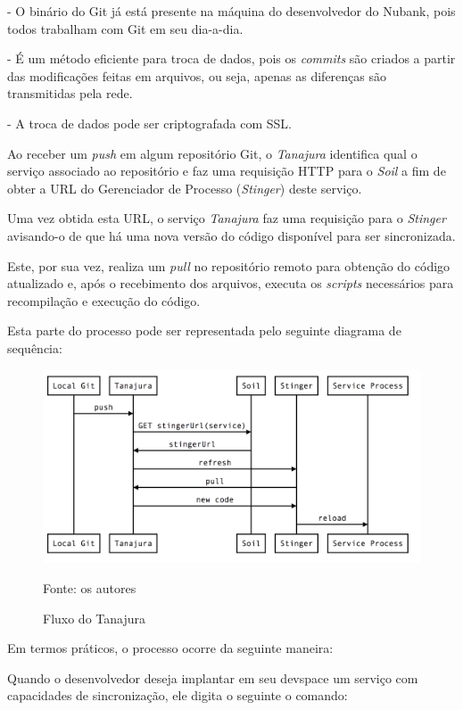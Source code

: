 \documentclass[]{politex}
\newcommand{\legend}[1]{\begin{center}\def\caption{}\caption{#1}\end{center}}
\begin{document}
	- O binário do Git já está presente na máquina do desenvolvedor do Nubank, pois todos trabalham com Git em seu dia-a-dia.
	
	- É um método eficiente para troca de dados, pois os \textit{commits} são criados a partir das modificações feitas em arquivos, ou seja, apenas as diferenças são transmitidas pela rede.
	
	- A troca de dados pode ser criptografada com SSL.

	Ao receber um \textit{push} em algum repositório Git, o \textit{Tanajura} identifica qual o serviço associado ao repositório e faz uma requisição HTTP para o \textit{Soil} a fim de obter a URL do Gerenciador de Processo (\textit{Stinger}) deste serviço.
	
	Uma vez obtida esta URL, o serviço \textit{Tanajura} faz uma requisição para o \textit{Stinger} avisando-o de que há uma nova versão do código disponível para ser sincronizada.
	
	Este, por sua vez, realiza um \textit{pull} no repositório remoto para obtenção do código atualizado e, após o recebimento dos arquivos, executa os \textit{scripts} necessários para recompilação e execução do código.
	
	Esta parte do processo pode ser representada pelo seguinte diagrama de sequência:
		\begin{figure}[htb]
			\caption{\label{fig_arquitetura2}Fluxo do Tanajura}
			\begin{center}
			\includegraphics[scale=0.20]{tanajura-flow.png}
			\end{center}
			\legend{Fonte: os autores}
		\end{figure}

	Em termos práticos, o processo ocorre da seguinte maneira:
	
	Quando o desenvolvedor deseja implantar em seu devspace um serviço com capacidades de sincronização, ele digita o seguinte o comando:
\end{document}

